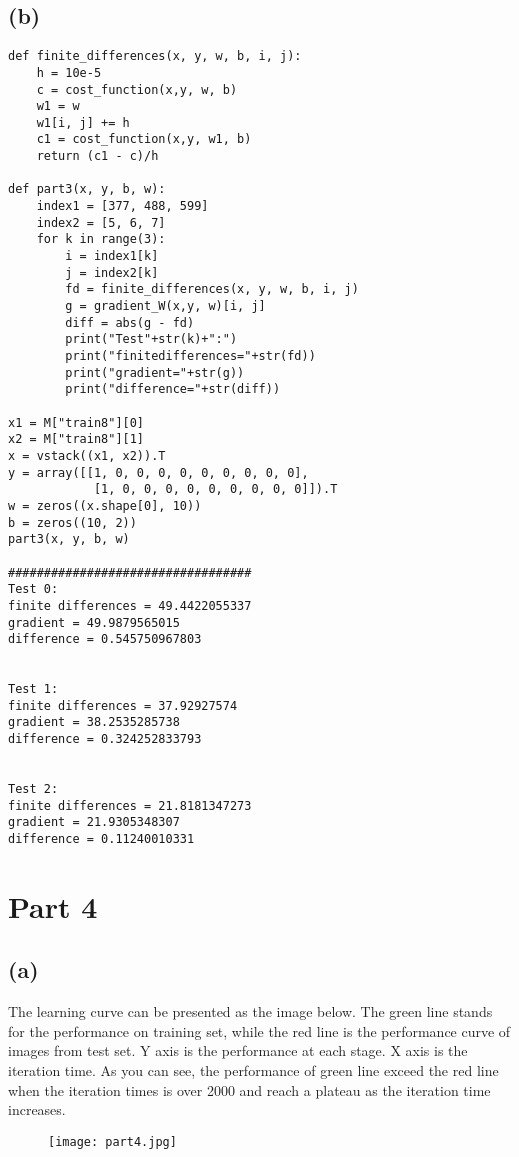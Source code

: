 \documentclass{article}
\begin{document}
\subsection*{(b)}


\Large\begin{lstlisting}[basicstyle=\Large\ttfamily]
def finite_differences(x, y, w, b, i, j):
    h = 10e-5
    c = cost_function(x,y, w, b) 
    w1 = w
    w1[i, j] += h
    c1 = cost_function(x,y, w1, b) 
    return (c1 - c)/h
    
def part3(x, y, b, w):
    index1 = [377, 488, 599]  
    index2 = [5, 6, 7]
    for k in range(3):
        i = index1[k]
        j = index2[k]
        fd = finite_differences(x, y, w, b, i, j)
        g = gradient_W(x,y, w)[i, j]
        diff = abs(g - fd)
        print("Test"+str(k)+":")
        print("finitedifferences="+str(fd))
        print("gradient="+str(g))
        print("difference="+str(diff))

x1 = M["train8"][0]
x2 = M["train8"][1]
x = vstack((x1, x2)).T
y = array([[1, 0, 0, 0, 0, 0, 0, 0, 0, 0], 
            [1, 0, 0, 0, 0, 0, 0, 0, 0, 0]]).T
w = zeros((x.shape[0], 10))
b = zeros((10, 2))
part3(x, y, b, w)

##################################
Test 0:
finite differences = 49.4422055337
gradient = 49.9879565015
difference = 0.545750967803


Test 1:
finite differences = 37.92927574
gradient = 38.2535285738
difference = 0.324252833793


Test 2:
finite differences = 21.8181347273
gradient = 21.9305348307
difference = 0.11240010331

\end{lstlisting}

\section*{Part 4}
\subsection*{(a)}
The learning curve can be presented as the image below. The green line stands for the performance on training set, while the red line is the performance curve of images from test set. Y axis is the performance at each stage. X axis is the iteration time. As you can see, the performance of green line exceed the red line when the iteration times is over 2000 and reach a plateau as the iteration time increases. 
\begin{figure}[!htb]
  \texttt{[image: part4.jpg]}
  \caption*{}\label{fig:part4}
\end{figure}
\end{document}
